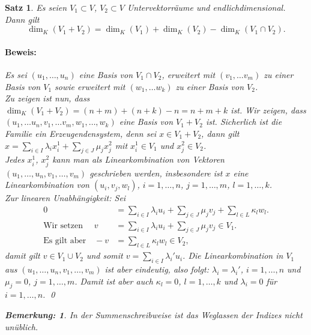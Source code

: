 \documentclass{report}
\newcommand{\lb}{\lambda}
\theoremstyle{customrem}
\newtheorem*{bemerkung}{Bemerkung\textnormal:}
\theoremstyle{customdef}
\newtheorem{satz}[definition]{Satz}
\renewenvironment{proof}{\paragraph{Beweis: }}{\qed}
\theoremstyle{customenv}
\begin{document}
	\begin{satz}
		Es seien \(V_1 \subset V\), \(V_2 \subset V\) Untervektorräume und endlichdimensional. Dann gilt \[\dim_K(V_1 + V_2) = \dim_K(V_1) + \dim_K(V_2) - \dim_K(V_1 \cap V_2).\]
		
		\begin{proof}
			Es sei \((u_1, \ldots, u_n)\) eine Basis von \(V_1\cap V_2\), erweitert mit \((v_1, \ldots v_m)\) zu einer Basis von \(V_1\) sowie erweitert mit \((w_1, \ldots w_k)\) zu einer Basis von \(V_2\). \\
			
			Zu zeigen ist nun, dass \(\dim_K(V_1 + V_2) = (n+m) + (n+k) -n = n+m+k\) ist. Wir zeigen, dass \((u_1, \ldots u_n, v_1, \ldots v_m,  w_1, \ldots, w_k)\) eine Basis von \(V_1 + V_2\) ist. Sicherlich ist die Familie ein Erzeugendensystem, denn sei \(x\in V_1 + V_2\), dann gilt \(x = \sum_{i\in I}\lb_i x_i^1 + \sum_{j\in J} \mu_j x_j^2\) mit \(x_i^1\in V_1\) und \(x_j^2\in V_2\).\\
			
			Jedes \(x_i^1\), \(x_j^2\) kann man als Linearkombination von Vektoren \((u_1,\ldots, u_n, v_1, \ldots, v_m)\) geschrieben werden, insbesondere ist \(x\) eine Linearkombination von \((u_i, v_j, w_l)\), \(i = 1,\ldots, n\), \(j=1, \ldots, m\), \(l = 1, \ldots, k\). \\
			
			Zur linearen Unabhängigkeit: Sei 
			\begin{align*}
				0	&= \sum_{i\in I}\lb_i u_i + \sum_{j\in J} \mu_j v_j + \sum_{l\in L} \kappa_l w_l.\\\text{Wir setzen }\quad
				v	&= \sum_{i\in I} \lb_i u_i + \sum_{j \in J} \mu_j v_j\in V_1.\\\text{Es gilt aber}\quad
				-v 	&= \sum_{l\in L}\kappa_l w_l\in V_2,
			\end{align*}
			damit gilt \(v\in V_1 \cup V_2\) und somit \(v=\sum_{i\in I}\lb_i'u_i\). Die Linearkombination in \(V_1\) aus \((u_1, \ldots, u_n, v_1, \ldots, v_m)\) ist aber eindeutig, also folgt: \(\lb_i = \lb_i'\), \(i = 1, \ldots, n\) und \(\mu_j = 0\), \(j =1, \ldots, m\). Damit ist aber auch \(\kappa_l=0\), \(l=1, \ldots, k\) und \(\lb_i=0\) für \(i=1, \ldots, n\). 
		\end{proof}
		\vspace{.2cm}
		\begin{bemerkung}
			In der Summenschreibweise ist das Weglassen der Indizes nicht unüblich.
		\end{bemerkung}
	\end{satz}
	
\end{document}
